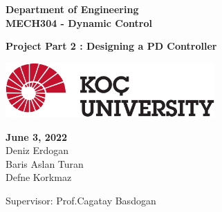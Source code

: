 \begin{titlepage}
	\begin{center}
		\vspace*{1cm}
        \hline
        \vspace{0.4cm}
		\textbf{\Large Department of Engineering  \\MECH304 - Dynamic Control\\}
		\vspace{0.4cm}
		\hline

		\vspace{2cm}
		\textbf{\Huge{Project Part 2 : Designing a PD Controller\\}}
		\vspace{0.1cm}
		\vspace{4cm}
		
		
        \includegraphics[width=0.6\textwidth]{images/koclogo.png}
        
        
        \vfill
        \Large \textbf{June 3, 2022} \\
        \Large{Deniz Erdogan \\
        Baris Aslan Turan \\
        Defne Korkmaz}
        
        \vspace{1cm}
        \large{Supervisor: Prof.Cagatay Basdogan}
        


		\vspace{0.8cm}


	\end{center}
\end{titlepage}